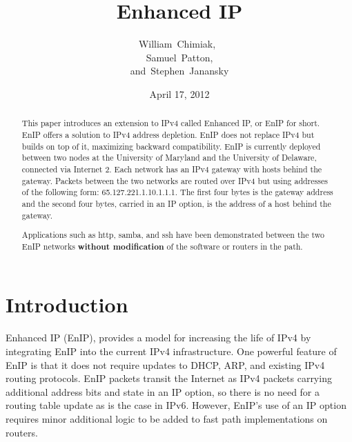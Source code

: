 \documentclass[letterpaper,final,peerreview,10pt,onecolumn]{IEEEtranTCOM}
\begin{document}
\title{Enhanced IP}
\date{April 17, 2012}
\author{William~Chimiak,~\\ Samuel~Patton,\\ and~Stephen~Janansky}


\maketitle


\begin{abstract}
This paper introduces an extension to IPv4 called Enhanced IP, or EnIP for
short.  EnIP offers a solution to IPv4 address depletion. EnIP
does not replace IPv4 but builds on top of it, maximizing backward
compatibility.  EnIP is currently deployed between two nodes at the University
of Maryland and the University of Delaware, connected via Internet 2.
Each network has an IPv4 gateway with hosts behind the gateway.
Packets between the two networks are routed over IPv4 but using addresses
of the following form: 65.127.221.1.10.1.1.1.  The first four bytes
is the gateway address and the second four bytes, carried in an IP option, is
the address of a host behind the gateway.  
  
Applications such as http, samba, and ssh have been demonstrated between 
the two EnIP networks \textbf{without modification} of the software or routers 
in the path.
\end{abstract}


\section{Introduction}

Enhanced IP (EnIP), provides a model for increasing the
life of IPv4 by integrating EnIP into the current
IPv4 infrastructure.  One powerful feature of EnIP is that it
does not require updates to DHCP, ARP, and existing IPv4 routing
protocols.  EnIP packets transit the Internet as IPv4 packets
carrying additional address bits and state in an IP option, so
there is no need for a routing table update as is the case in IPv6.
However, EnIP's use of an IP option requires minor additional logic to
be added to fast path implementations on routers\cite{router01}.
\end{document}
